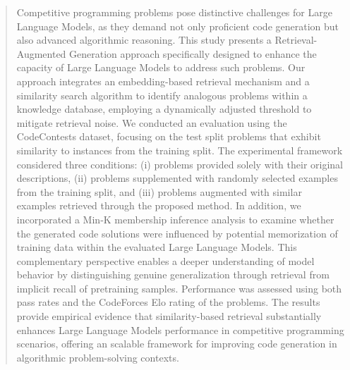 \documentclass[preprint,12pt]{elsarticle}
\begin{document}
\begin{frontmatter}
\begin{abstract}


Competitive programming problems pose distinctive challenges for Large Language Models, as they demand not only proficient code generation but also advanced algorithmic reasoning. This study presents a Retrieval-Augmented Generation approach specifically designed to enhance the capacity of Large Language Models to address such problems. Our approach integrates an embedding-based retrieval mechanism and a similarity search algorithm to identify analogous problems within a knowledge database, employing a dynamically adjusted threshold to mitigate retrieval noise. We conducted an evaluation  using the CodeContests dataset, focusing on the test split problems that exhibit similarity to instances from the training split. The experimental framework considered three conditions: (i) problems provided solely with their original descriptions, (ii) problems supplemented with randomly selected examples from the training split, and (iii) problems augmented with similar examples retrieved through the proposed method.
In addition, we incorporated a Min‑K membership inference analysis to examine whether the generated code solutions were influenced by potential memorization of training data within the evaluated Large Language Models. This complementary perspective enables a deeper understanding of model behavior by distinguishing genuine generalization through retrieval from implicit recall of pretraining samples.
Performance was assessed using both pass rates and the CodeForces Elo rating of the problems. The results provide empirical evidence that similarity-based retrieval substantially enhances Large Language Models performance in competitive programming scenarios, offering an scalable framework for improving code generation in algorithmic problem-solving contexts.


\end{abstract}
\end{frontmatter}
\end{document}
